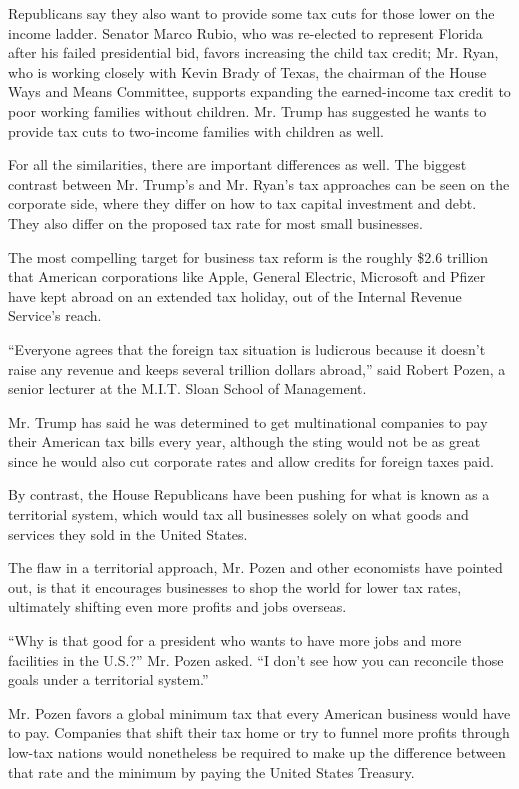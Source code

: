 Republicans say they also want to provide some tax cuts for those lower
on the income ladder. Senator Marco Rubio, who was re-elected to
represent Florida after his failed presidential bid, favors increasing
the child tax credit; Mr. Ryan, who is working closely with Kevin Brady
of Texas, the chairman of the House Ways and Means Committee, supports
expanding the earned-income tax credit to poor working families without
children. Mr. Trump has suggested he wants to provide tax cuts to
two-income families with children as well.

For all the similarities, there are important differences as well. The
biggest contrast between Mr. Trump's and Mr. Ryan's tax approaches can
be seen on the corporate side, where they differ on how to tax capital
investment and debt. They also differ on the proposed tax rate for most
small businesses.

The most compelling target for business tax reform is the roughly \$2.6
trillion that American corporations like Apple, General Electric,
Microsoft and Pfizer have kept abroad on an extended tax holiday, out of
the Internal Revenue Service's reach.

``Everyone agrees that the foreign tax situation is ludicrous because it
doesn't raise any revenue and keeps several trillion dollars abroad,''
said Robert Pozen, a senior lecturer at the M.I.T. Sloan School of
Management.

Mr. Trump has said he was determined to get multinational companies to
pay their American tax bills every year, although the sting would not be
as great since he would also cut corporate rates and allow credits for
foreign taxes paid.

By contrast, the House Republicans have been pushing for what is known
as a territorial system, which would tax all businesses solely on what
goods and services they sold in the United States.

The flaw in a territorial approach, Mr. Pozen and other economists have
pointed out, is that it encourages businesses to shop the world for
lower tax rates, ultimately shifting even more profits and jobs
overseas.

``Why is that good for a president who wants to have more jobs and more
facilities in the U.S.?'' Mr. Pozen asked. ``I don't see how you can
reconcile those goals under a territorial system.''

Mr. Pozen favors a global minimum tax that every American business would
have to pay. Companies that shift their tax home or try to funnel more
profits through low-tax nations would nonetheless be required to make up
the difference between that rate and the minimum by paying the United
States Treasury.

